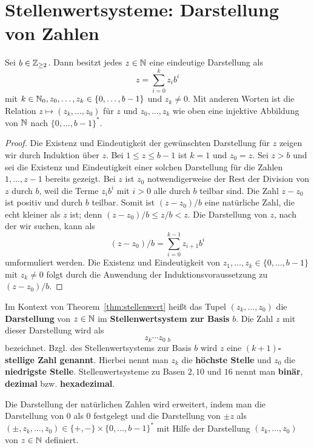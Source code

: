 \section{Stellenwertsysteme: Darstellung von Zahlen}

\begin{thm} \label{thm:stellenwert}
	Sei $b \in \mathbb{Z}_{\ge 2}$. Dann besitzt jedes $z \in \mathbb{N}$ eine eindeutige Darstellung als 
	\begin{equation}\label{z:zur:Basis:b}
		z = \sum_{i=0}^k z_i b^i
	\end{equation}
	mit $k \in \mathbb{N}_0, z_0,\ldots,z_k \in \{0,\ldots,b-1\}$ und $z_k \ne 0$. Mit anderen Worten ist die Relation $z \mapsto (z_k,\ldots,z_0)$ für $z$ und $z_0,\ldots,z_k$ wie oben eine injektive Abbildung von $\mathbb{N}$ nach $\{0,\ldots,b-1\}^\ast$.
\end{thm}
\begin{proof}
 	Die Existenz und Eindeutigkeit der gewünschten Darstellung für $z$ zeigen wir durch Induktion über $z$. Bei $1 \le z \le b-1$ ist $k=1$ und $z_0=z$. Sei $z>b$ und sei die Existenz und Eindeutigkeit einer solchen Darstellung für die Zahlen $1,\ldots,z-1$ bereits gezeigt. Bei $z$ ist $z_0$ notwendigerweise der Rest der Division von $z$ durch $b$, weil die Terme $z_i b^i$ mit $i>0$ alle durch $b$ teilbar sind. Die Zahl $z-z_0$ ist positiv und durch $b$ teilbar. Somit ist $(z-z_0) / b$ eine natürliche Zahl, die echt kleiner als $z$ ist; denn $(z-z_0)/b \le z / b < z$. Die Darstellung von $z$, nach der wir suchen, kann als 
 	\[
 		(z-z_0)/b = \sum_{i=0}^{k-1} z_{i+1} b^i
 	\]
 	umformuliert werden. Die Existenz und Eindeutigkeit von $z_1,\ldots,z_k \in \{0,\ldots,b-1\}$ mit $z_k \ne 0$ folgt durch die Anwendung der Induktionsvoraussetzung zu $(z-z_0)/b$. 
\end{proof} 

\begin{defn}
	Im Kontext von Theorem~\ref{thm:stellenwert} heißt das Tupel $(z_k,\ldots,z_0)$ die \textbf{Darstellung} von $z \in \mathbb{N}$ im \textbf{Stellenwertsystem zur Basis} $b$. Die Zahl $z$ mit dieser Darstellung wird als 
	\[	
			z_k \cdots z_0 \ {}_{b}
	\]
	bezeichnet. Bzgl. des Stellenwertsystems zur Basis $b$ wird $z$ eine \textbf{$(k+1)$-stellige Zahl genannt}. Hierbei nennt man $z_k$ die \textbf{höchste Stelle} und $z_0$ die \textbf{niedrigste Stelle}.  Stellenwertsysteme zu Basen $2, 10$ und $16$ nennt man \textbf{binär}, \textbf{dezimal} bzw. \textbf{hexadezimal}. 
	
	Die Darstellung der natürlichen Zahlen wird  erweitert, indem man die Darstellung von $0$ als $0$ festgelegt und die Darstellung von $\pm z$ als $(\pm ,z_k,\ldots,z_0) \in \{+,-\} \times \{0,\ldots,b-1\}^\ast$ mit Hilfe der Darstellung $(z_k,\ldots,z_0)$  von $z \in \mathbb{N}$ definiert. 
\end{defn} 

